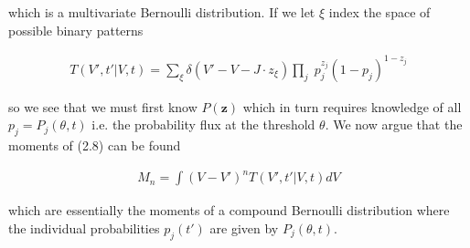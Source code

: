 \documentclass{ucetd}
\begin{document}
which is a multivariate Bernoulli distribution. If we let $\xi$ index the space of possible binary patterns

\begin{align}
T(V',t'|V,t) = \sum_{\xi} \delta(V'- V - J\cdot z_{\xi})\underset{j}{\prod} \; p_{j}^{z_{j}}(1-p_{j})^{1-z_{j}}
\end{align}

so we see that we must first know $P(\mathbf{z})$ which in turn requires knowledge of all $p_{j} = P_{j}(\theta, t)$ i.e. the probability flux at the threshold $\theta$. We now argue that the moments of (2.8) can be found 

\begin{align}
M_{n} = \int (V-V')^{n} T(V',t'|V,t) dV
\end{align}

which are essentially the moments of a compound Bernoulli distribution where the individual probabilities $p_{j}(t')$ are given by $P_{j}(\theta, t)$.
\end{document}
